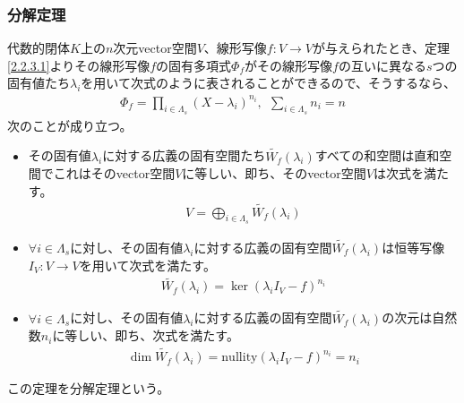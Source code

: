 \documentclass[dvipdfmx]{jsarticle}
\begin{document}
\subsubsection{分解定理}%
\begin{thm}[分解定理]
\label{2.2.4.13}
代数的閉体$K$上の$n$次元vector空間$V$、線形写像$f:V \rightarrow V$が与えられたとき、定理\ref{2.2.3.1}よりその線形写像$f$の固有多項式$\varPhi_{f}$がその線形写像$f$の互いに異なる$s$つの固有値たち$\lambda_{i}$を用いて次式のように表されることができるので、そうするなら、
\begin{align*}
\varPhi_{f} = \prod_{i \in \varLambda_{s}} \left( X - \lambda_{i} \right)^{n_{i}},\ \ \sum_{i \in \varLambda_{s}} n_{i} = n
\end{align*}
次のことが成り立つ。
\begin{itemize}
\item
  その固有値$\lambda_{i}$に対する広義の固有空間たち$\widetilde{W_{f}}\left( \lambda_{i} \right)$すべての和空間は直和空間でこれはそのvector空間$V$に等しい、即ち、そのvector空間$V$は次式を満たす。
\begin{align*}
V = \bigoplus_{i \in \varLambda_{s}} {\widetilde{W_{f}}\left( \lambda_{i} \right)}
\end{align*}
\item
  $\forall i \in \varLambda_{s}$に対し、その固有値$\lambda_{i}$に対する広義の固有空間$\widetilde{W_{f}}\left( \lambda_{i} \right)$は恒等写像$I_{V}:V \rightarrow V$を用いて次式を満たす。
\begin{align*}
\widetilde{W_{f}}\left( \lambda_{i} \right) = \ker\left( \lambda_{i}I_{V} - f \right)^{n_{i}}
\end{align*}
\item
  $\forall i \in \varLambda_{s}$に対し、その固有値$\lambda_{i}$に対する広義の固有空間$\widetilde{W_{f}}\left( \lambda_{i} \right)$の次元は自然数$n_{i}$に等しい、即ち、次式を満たす。
\begin{align*}
\dim{\widetilde{W_{f}}\left( \lambda_{i} \right)} = {\mathrm{nullity}}\left( \lambda_{i}I_{V} - f \right)^{n_{i}} = n_{i}
\end{align*}
\end{itemize}
この定理を分解定理という。
\end{thm}
\end{document}
